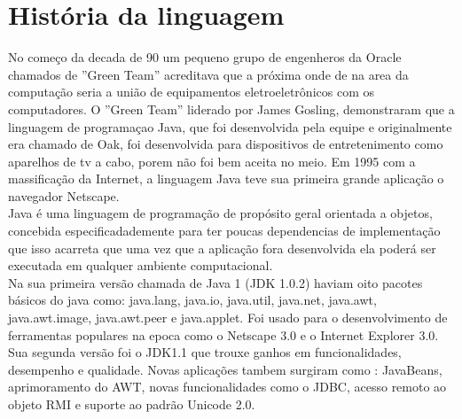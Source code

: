 \section{História da linguagem}

No começo da decada de 90 um pequeno grupo de engenheros da Oracle chamados de ''Green Team'' acreditava que a próxima onde de na area da computação seria a união de equipamentos eletroeletrônicos com os computadores. O ''Green Team'' liderado por James Gosling, demonstraram que a linguagem de programaçao Java, que foi desenvolvida pela equipe e originalmente era chamado de Oak, foi desenvolvida para dispositivos de entretenimento como aparelhos de tv a cabo, porem não foi bem aceita no meio. Em 1995 com a massificação da Internet, a linguagem Java teve sua primeira grande aplicação o navegador Netscape.\\

Java é uma linguagem de programação de propósito geral orientada a objetos, concebida especificadademente para ter poucas dependencias de implementação que isso acarreta que uma vez que a aplicação fora desenvolvida ela poderá ser executada em qualquer ambiente computacional.\\

Na sua primeira versão chamada de Java 1 (\acs{JDK} 1.0.2) haviam oito pacotes básicos do java como: java.lang, java.io, java.util, java.net, java.awt, java.awt.image, java.awt.peer e java.applet. Foi usado para o desenvolvimento de ferramentas populares na epoca como o Netscape 3.0 e o Internet Explorer 3.0. \\

Sua segunda versão foi o \acs{JDK}1.1 \cite{JDK1.1} que trouxe ganhos em funcionalidades, desempenho e qualidade. Novas aplicações tambem surgiram como : JavaBeans, aprimoramento do \acs{AWT}, novas funcionalidades como o \acs{JDBC}, acesso remoto ao objeto \acs{RMI} e suporte ao padrão Unicode 2.0.\\

